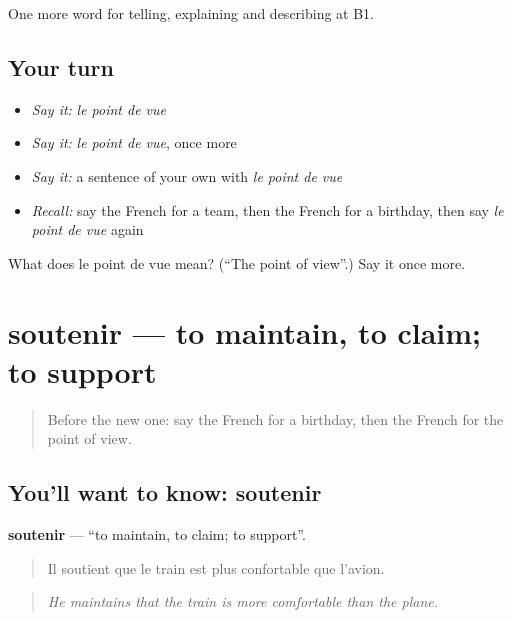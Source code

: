 \begin{grammarlens}[title={What you've built}]
One more word for telling, explaining and describing at B1.
\end{grammarlens}

\subsection*{Your turn}
\begin{itemize}
\raggedright
  \item \emph{Say it:} \emph{le point de vue}
  \item \emph{Say it:} \emph{le point de vue}, once more
  \item \emph{Say it:} a sentence of your own with \emph{le point de vue}
  \item \emph{Recall:} say the French for a team, then the French for a birthday, then say \emph{le point de vue} again
\end{itemize}

\begin{tcolorbox}[breakable,colback=teal!4,colframe=teal!35!black,title={Before you move on}]
What does le point de vue mean? (\textquotedblleft{}The point of view\textquotedblright{}.) Say it once more.
\end{tcolorbox}
\section[soutenir]{soutenir — to maintain, to claim; to support}

\label{lesson:FR-C334-soutenir}



\begin{quote}
Before the new one: say the French for a birthday, then the French for the point of view.
\end{quote}

\subsection*{You'll want to know: soutenir}
\textbf{soutenir} — \textquotedblleft{}to maintain, to claim; to support\textquotedblright{}.

\begin{quote}
Il soutient que le train est plus confortable que l'avion.
\end{quote}

\begin{quote}
\emph{He maintains that the train is more comfortable than the plane.}
\end{quote}


